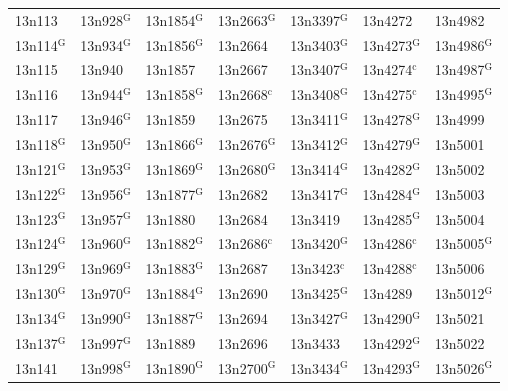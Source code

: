 \documentclass[12pt, oneside]{amsart}
\begin{document}
{\begin{longtable}{*{7}{>{\raggedright\arraybackslash}p{}}}
13n113 & 13n928$^{\mathrm{G}}$ & 13n1854$^{\mathrm{G}}$ & 13n2663$^{\mathrm{G}}$ & 13n3397$^{\mathrm{G}}$ & 13n4272 & 13n4982 \\
13n114$^{\mathrm{G}}$ & 13n934$^{\mathrm{G}}$ & 13n1856$^{\mathrm{G}}$ & 13n2664 & 13n3403$^{\mathrm{G}}$ & 13n4273$^{\mathrm{G}}$ & 13n4986$^{\mathrm{G}}$ \\
13n115 & 13n940 & 13n1857 & 13n2667 & 13n3407$^{\mathrm{G}}$ & 13n4274$^{\mathrm{c}}$ & 13n4987$^{\mathrm{G}}$ \\
13n116 & 13n944$^{\mathrm{G}}$ & 13n1858$^{\mathrm{G}}$ & 13n2668$^{\mathrm{c}}$ & 13n3408$^{\mathrm{G}}$ & 13n4275$^{\mathrm{c}}$ & 13n4995$^{\mathrm{G}}$ \\
13n117 & 13n946$^{\mathrm{G}}$ & 13n1859 & 13n2675 & 13n3411$^{\mathrm{G}}$ & 13n4278$^{\mathrm{G}}$ & 13n4999 \\
13n118$^{\mathrm{G}}$ & 13n950$^{\mathrm{G}}$ & 13n1866$^{\mathrm{G}}$ & 13n2676$^{\mathrm{G}}$ & 13n3412$^{\mathrm{G}}$ & 13n4279$^{\mathrm{G}}$ & 13n5001 \\
13n121$^{\mathrm{G}}$ & 13n953$^{\mathrm{G}}$ & 13n1869$^{\mathrm{G}}$ & 13n2680$^{\mathrm{G}}$ & 13n3414$^{\mathrm{G}}$ & 13n4282$^{\mathrm{G}}$ & 13n5002 \\
13n122$^{\mathrm{G}}$ & 13n956$^{\mathrm{G}}$ & 13n1877$^{\mathrm{G}}$ & 13n2682 & 13n3417$^{\mathrm{G}}$ & 13n4284$^{\mathrm{G}}$ & 13n5003 \\
13n123$^{\mathrm{G}}$ & 13n957$^{\mathrm{G}}$ & 13n1880 & 13n2684 & 13n3419 & 13n4285$^{\mathrm{G}}$ & 13n5004 \\
13n124$^{\mathrm{G}}$ & 13n960$^{\mathrm{G}}$ & 13n1882$^{\mathrm{G}}$ & 13n2686$^{\mathrm{c}}$ & 13n3420$^{\mathrm{G}}$ & 13n4286$^{\mathrm{c}}$ & 13n5005$^{\mathrm{G}}$ \\
13n129$^{\mathrm{G}}$ & 13n969$^{\mathrm{G}}$ & 13n1883$^{\mathrm{G}}$ & 13n2687 & 13n3423$^{\mathrm{c}}$ & 13n4288$^{\mathrm{c}}$ & 13n5006 \\
13n130$^{\mathrm{G}}$ & 13n970$^{\mathrm{G}}$ & 13n1884$^{\mathrm{G}}$ & 13n2690 & 13n3425$^{\mathrm{G}}$ & 13n4289 & 13n5012$^{\mathrm{G}}$ \\
13n134$^{\mathrm{G}}$ & 13n990$^{\mathrm{G}}$ & 13n1887$^{\mathrm{G}}$ & 13n2694 & 13n3427$^{\mathrm{G}}$ & 13n4290$^{\mathrm{G}}$ & 13n5021 \\
13n137$^{\mathrm{G}}$ & 13n997$^{\mathrm{G}}$ & 13n1889 & 13n2696 & 13n3433 & 13n4292$^{\mathrm{G}}$ & 13n5022 \\
13n141 & 13n998$^{\mathrm{G}}$ & 13n1890$^{\mathrm{G}}$ & 13n2700$^{\mathrm{G}}$ & 13n3434$^{\mathrm{G}}$ & 13n4293$^{\mathrm{G}}$ & 13n5026$^{\mathrm{G}}$ \\

\end{longtable}}
\end{document}
